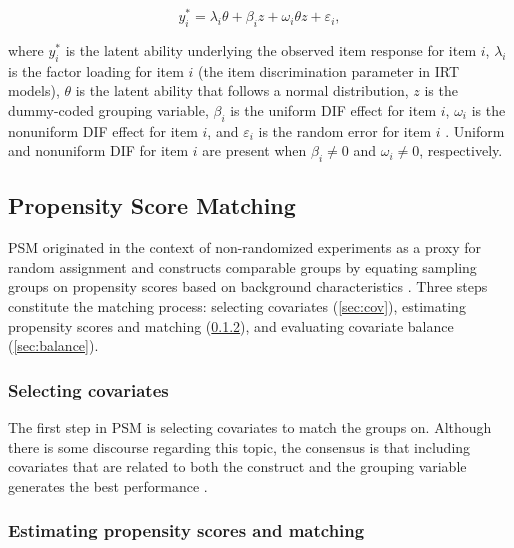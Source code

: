 \documentclass{article}
\begin{document}
\begin{equation} \label{eq:mimic_oneitem}
    y_i^* = \lambda_i\theta + \beta_i z + \omega_i\theta z + \varepsilon_i,
\end{equation}

where $y_i^*$ is the latent ability underlying the observed item response for item $i$, $\lambda_i$ is the factor loading for item $i$ (the item discrimination parameter in IRT models), $\theta$ is the latent ability that follows a normal distribution, $z$ is the dummy-coded grouping variable, $\beta_i$ is the uniform DIF effect for item $i$, $\omega_i$ is the nonuniform DIF effect for item $i$, and $\varepsilon_i$ is the random error for item $i$ \citep{bulut2017detecting}. Uniform and nonuniform DIF for item $i$ are present when $\beta_i \neq 0$ and $\omega_i \neq 0$, respectively. 


\subsection{Propensity Score Matching} \label{sec:psm}

PSM originated in the context of non-randomized experiments as a proxy for random assignment and constructs comparable groups by equating sampling groups on propensity scores based on background characteristics \citep{rosenbaum1983central}. Three steps constitute the matching process: selecting covariates (\ref{sec:cov}), estimating propensity scores and matching (\ref{sec:est_psm}), and evaluating covariate balance (\ref{sec:balance}). 

\subsubsection{Selecting covariates} \label{sec:select_cov}

The first step in PSM is selecting covariates to match the groups on. Although there is some discourse regarding this topic, the consensus is that including covariates that are related to both the construct and the grouping variable generates the best performance \citep{stuart2010matching}. %

\subsubsection{Estimating propensity scores and matching} \label{sec:est_psm}
\end{document}
